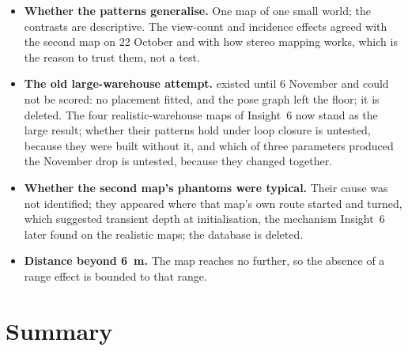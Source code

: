\documentclass[11pt,a4paper,notitlepage]{report}
\begin{document}
\begin{itemize}
\item \textbf{Whether the patterns generalise.} One map of one small world;
      the contrasts are descriptive. The view-count and incidence effects
      agreed with the second map on 22 October and with how stereo mapping
      works, which is the reason to trust them, not a test.
\item \textbf{The old large-warehouse attempt.}  existed
      until 6 November and could not be scored: no placement fitted, and the
      pose graph left the floor; it is deleted.
      The four realistic-warehouse maps of Insight~6 now stand as the large
      result; whether their patterns hold under loop closure is untested,
      because they were built without it, and which of three parameters
      produced the November drop is untested, because they changed together.
\item \textbf{Whether the second map's phantoms were typical.} Their cause
      was not identified; they appeared where that map's own route started
      and turned, which suggested transient depth at initialisation, the
      mechanism Insight~6 later found on the realistic maps; the database is
      deleted.
\item \textbf{Distance beyond \SI{6}{\metre}.} The map reaches no further, so
      the absence of a range effect is bounded to that range.
\end{itemize}

\section{Summary}
\end{document}
